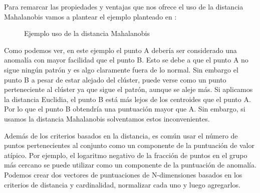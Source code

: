 Para remarcar las propiedades y ventajas que nos ofrece el uso de la distancia
Mahalanobis vamos a plantear el ejemplo planteado en \cite{aggarwalOutlierAnalysis2017}:
\begin{figure}[h]
    \caption{\label{fig:distance_maha} Ejemplo uso de la distancia Mahalanobis}
\end{figure}

Como podemos ver, en este ejemplo el punto A debería ser considerado una
anomalía con mayor facilidad que el punto B. Esto se debe a que el punto 
A no sigue ningún patrón y es algo claramente fuera de lo normal. Sin embargo
el punto B a pesar de estar alejado del clúster, puede verse como un punto
perteneciente al clúster ya que sigue el patrón, aunque se aleje más. Si aplicamos
la distancia Euclidia, el punto B está más lejos de los centroides que el
punto A. Por lo que el punto B obtendría una puntuación mayor que A. Sin 
embargo, si usamos la distancia Mahalanobis solventamos estos inconvenientes.


Además de los criterios basados en la distancia, es común usar el número
de puntos pertenecientes al conjunto como un componente de la puntuación
de valor atípico. Por ejemplo, el logaritmo negativo de la fracción de
puntos en el grupo más cercano se puede utilizar como un componente de
la puntuación de anomalía. Podemos crear dos vectores de puntuaciones
de N-dimensiones basados en los criterios de distancia y cardinalidad,
normalizar cada uno y luego agregarlos.

